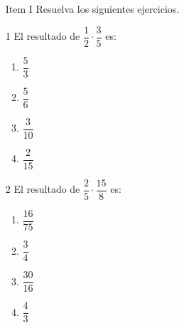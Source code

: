 \documentclass[12pt]{article}
\begin{document}
		\begin{enumerate}
		\item [Item I] Resuelva los siguientes ejercicios. 
	\end{enumerate}
\begin{multicols}{2}
	\begin{enumerate}
		\item [1] El resultado de $\dfrac{1}{2} \cdot \dfrac{3}{5}$	es: 
	\begin{enumerate}
	\item $\dfrac{5}{3}$\\
	\item $\dfrac{5}{6}$\\
	\item $\dfrac{3}{10}$\\
	\item $\dfrac{2}{15}$\\

\end{enumerate}
\end{enumerate}

\begin{enumerate}
\item [2]El resultado de $\dfrac{2}{5} \cdot \dfrac{15}{8}$	es:
\begin{enumerate}
	\item $\dfrac{16}{75}$\\
	\item $\dfrac{3}{4}$\\
	\item $\dfrac{30}{16}$\\
	\item $\dfrac{4}{3}$\\

\end{enumerate}
\end{enumerate}
\end{multicols}
\end{document}
